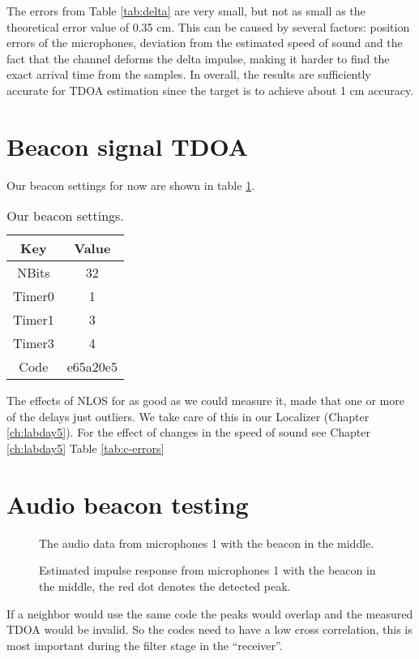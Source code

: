 \documentclass[final]{scrreprt} %
\begin{document}
The errors from Table \ref{tab:delta} are very small, but not as small as the theoretical error value of 0.35 cm.
This can be caused by several factors: position errors of the microphones, deviation from the estimated speed of sound and the fact that the channel deforms the delta impulse, making it harder to find the exact arrival time from the samples.
In overall, the results are sufficiently accurate for TDOA estimation since the target is to achieve about 1 cm accuracy.

\section{Beacon signal TDOA}
Our beacon settings for now are shown in table \ref{tab:beacon-settings}.
\begin{table} [H]
	\centering
	\begin{tabular} { c | c }
	Key & Value \\ \hline
	NBits & 32 \\
	Timer0 & 1 \\
	Timer1 & 3 \\
	Timer3 & 4 \\
	Code & e65a20e5 \\	
	\end{tabular}
\caption{Our beacon settings.}
\label{tab:beacon-settings}
\end{table}
The effects of NLOS for as good as we could measure it, made that one or more of the delays just outliers.
We take care of this in our Localizer (Chapter \ref{ch:labday5}).
For the effect of changes in the speed of sound see Chapter \ref{ch:labday5} Table \ref{tab:c-errors}

\section{Audio beacon testing}
\begin{figure}[H]
	\centering
	\setlength\figureheight{4cm}
    	\setlength{}
	
	\caption{The audio data from microphones 1 with the beacon in the middle.}
	\label{fig:one-signal}
\end{figure}
\begin{figure}[H]
	\centering
	\setlength\figureheight{4cm}
    	\setlength{}
	
	\caption{Estimated impulse response from microphones 1 with the beacon in the middle, the red dot denotes the detected peak.}
	\label{fig:impluse-with-peak}
\end{figure}
If a neighbor would use the same code the peaks would overlap and the measured TDOA would be invalid.
So the codes need to have a low cross correlation, this is most important during the filter stage in the ``receiver''.
\end{document}
